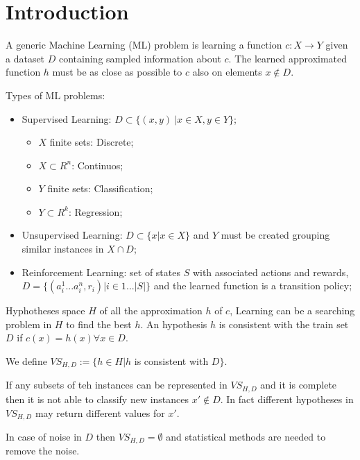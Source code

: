 \section{Introduction}

A generic Machine Learning (ML) problem is learning a function $c : X \rightarrow Y$ given a dataset $D$ containing sampled information about $c$. The learned approximated function $h$ must be as close as possible to $c$ also on elements $x \notin D$.

Types of ML problems:

\begin{itemize}
    \item Supervised Learning: $D \subset \{(x, y)\ | x \in X, y \in Y\}$;
    \begin{itemize}
        \item $X$ finite sets: Discrete;
        \item $X \subset R^n$: Continuos;
        \item $Y$ finite sets: Classification;
        \item $Y \subset R^k$: Regression;
    \end{itemize}
    \item Unsupervised Learning: $D \subset \{x | x \in X\}$ and $Y$ must be created grouping similar instances in $X \cap D$;
    \item Reinforcement Learning: set of states $S$ with associated actions and rewards, $D = \{(a_i^1 ... a_i^n, r_i) | i \in 1 ... |S|\}$ and the learned function is a transition policy;
\end{itemize}

Hyphotheses space $H$ of all the approximation $h$ of $c$, Learning can be a searching problem in $H$ to find the best $h$.
An hypothesis $h$ is consistent with the train set $D$ if $c(x) = h(x) \forall x \in D$.

We define $VS_{H,D} := \{h \in H | h $ is consistent with $ D\}$.

If any subsets of teh instances can be represented in $VS_{H,D}$ and it is complete then it is not able to classify new instances $x' \notin D$. In fact different hypotheses in $VS_{H,D}$ may return different values for $x'$.

In case of noise in $D$ then $VS_{H,D} = \emptyset$ and statistical methods are needed to remove the noise.
